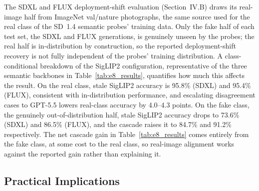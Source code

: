 \documentclass{ieeeaccess}
\begin{document}
The SDXL and FLUX deployment-shift evaluation (Section~IV.B) draws its real-image
half from ImageNet val/nature photographs, the same source used for the real
class of the SD~1.4 semantic probes' training data. Only the fake half of each
test set, the SDXL and FLUX generations, is genuinely unseen by the probes; the
real half is in-distribution by construction, so the reported deployment-shift
recovery is not fully independent of the probes' training distribution. A
class-conditional breakdown of the SigLIP2 configuration, representative of the
three semantic backbones in Table~\ref{tab:e8_results}, quantifies how much this
affects the result. On the real class, stale SigLIP2 accuracy is 95.8\% (SDXL) and
95.4\% (FLUX), consistent with in-distribution performance, and escalating
disagreement cases to GPT-5.5 lowers real-class accuracy by 4.0--4.3 points. On
the fake class, the genuinely out-of-distribution half, stale SigLIP2 accuracy
drops to 73.6\% (SDXL) and 86.5\% (FLUX), and the cascade raises it to 84.7\% and
91.2\% respectively. The net cascade gain in Table~\ref{tab:e8_results} comes
entirely from the fake class, at some cost to the real class, so real-image
alignment works against the reported gain rather than explaining it.

\subsection{Practical Implications}
\end{document}
